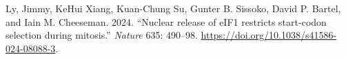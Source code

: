 \documentclass[
]{article}
\newlength{\cslhangindent}
\newenvironment{CSLReferences}[2] %
 {\begin{list}{}{%
  \setlength{\itemindent}{0pt}
  \setlength{\leftmargin}{0pt}
  \setlength{\parsep}{0pt}
  \ifodd #1
   \setlength{\leftmargin}{\cslhangindent}
   \setlength{\itemindent}{-1\cslhangindent}
  \fi
  \setlength{\itemsep}{#2\baselineskip}}}
 {\end{list}}
\begin{document}
\protect{}\label{refs}
\begin{CSLReferences}{1}{0}
Ly, Jimmy, KeHui Xiang, Kuan-Chung Su, Gunter B. Sissoko, David P.
Bartel, and Iain M. Cheeseman. 2024. {``{Nuclear release of eIF1
restricts start-codon selection during mitosis}.''} \emph{Nature} 635:
490--98. \url{https://doi.org/10.1038/s41586-024-08088-3}.

\end{CSLReferences}
\end{document}
